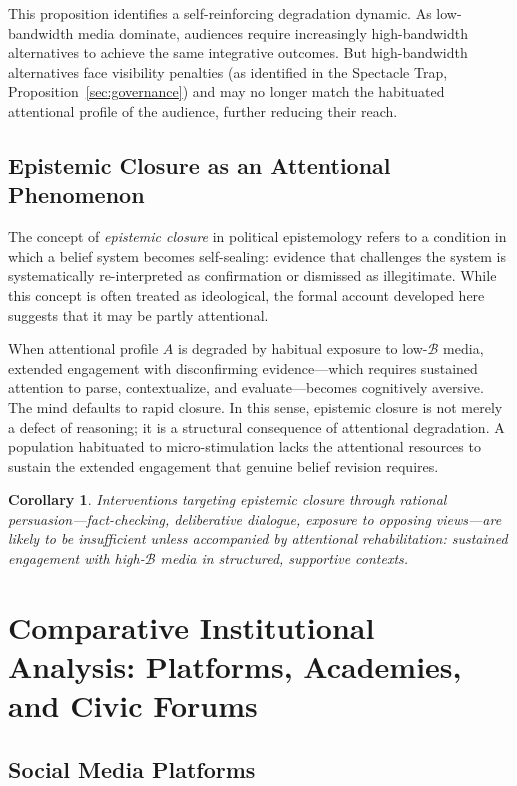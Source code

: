 \documentclass[12pt]{article}
\theoremstyle{definition}
\theoremstyle{plain}
\newtheorem{corollary}{Corollary}[theorem]
\begin{document}
This proposition identifies a self-reinforcing degradation dynamic. As low-bandwidth media dominate, audiences require increasingly high-bandwidth alternatives to achieve the same integrative outcomes. But high-bandwidth alternatives face visibility penalties (as identified in the Spectacle Trap, Proposition~\ref{sec:governance}) and may no longer match the habituated attentional profile of the audience, further reducing their reach.

\subsection{Epistemic Closure as an Attentional Phenomenon}

The concept of \emph{epistemic closure} in political epistemology refers to a condition in which a belief system becomes self-sealing: evidence that challenges the system is systematically re-interpreted as confirmation or dismissed as illegitimate. While this concept is often treated as ideological, the formal account developed here suggests that it may be partly attentional.

When attentional profile $A$ is degraded by habitual exposure to low-$\mathcal{B}$ media, extended engagement with disconfirming evidence---which requires sustained attention to parse, contextualize, and evaluate---becomes cognitively aversive. The mind defaults to rapid closure. In this sense, epistemic closure is not merely a defect of reasoning; it is a structural consequence of attentional degradation. A population habituated to micro-stimulation lacks the attentional resources to sustain the extended engagement that genuine belief revision requires.

\begin{corollary}
Interventions targeting epistemic closure through rational persuasion---fact-checking, deliberative dialogue, exposure to opposing views---are likely to be insufficient unless accompanied by attentional rehabilitation: sustained engagement with high-$\mathcal{B}$ media in structured, supportive contexts.
\end{corollary}

\section{Comparative Institutional Analysis: Platforms, Academies, and Civic Forums}
\label{sec:comparative}

\subsection{Social Media Platforms}
\end{document}
